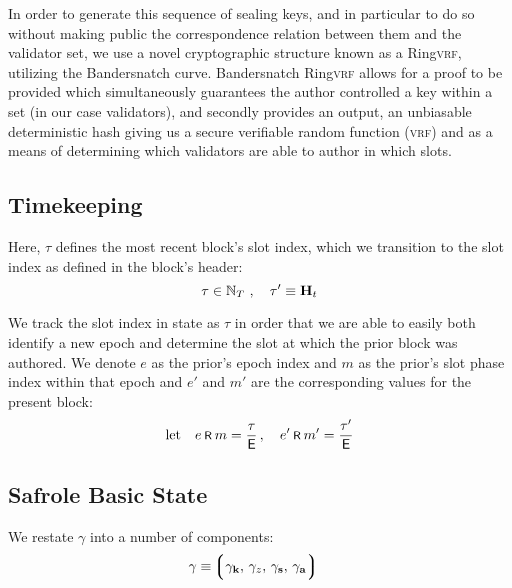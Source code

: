 In order to generate this sequence of sealing keys, and in particular to do so without making public the correspondence relation between them and the validator set, we use a novel cryptographic structure known as a Ring\textsc{vrf}, utilizing the Bandersnatch curve. Bandersnatch Ring\textsc{vrf} allows for a proof to be provided which simultaneously guarantees the author controlled a key within a set (in our case validators), and secondly provides an output, an unbiasable deterministic hash giving us a secure verifiable random function (\textsc{vrf}) and as a means of determining which validators are able to author in which slots.






\subsection{Timekeeping}\label{sec:timekeeping}

Here, $\tau$ defines the most recent block's slot index, which we transition to the slot index as defined in the block's header:
\begin{equation}\label{eq:timeslotindex}
  \tau \in \mathbb{N}_T \ ,\quad
  \tau' \equiv \mathbf{H}_t
\end{equation}

We track the slot index in state as $\tau$ in order that we are able to easily both identify a new epoch and determine the slot at which the prior block was authored. We denote $e$ as the prior's epoch index and $m$ as the prior's slot phase index within that epoch and $e'$ and $m'$ are the corresponding values for the present block:
\begin{align}
  \mathrm{let}\quad e \text{\hspace{2pt}\footnotesize{\textsf{R}}\hspace{2pt}} m = \frac{\tau}{\mathsf{{}E}} \,,\quad
  e' \text{\hspace{2pt}\footnotesize{\textsf{R}}\hspace{2pt}} m' = \frac{\tau'}{\mathsf{{}E}}
\end{align}









\subsection{Safrole Basic State}\label{sec:safrolebasicstate}

We restate $\gamma$ into a number of components:
\begin{align}\label{eq:consensusstatecomposition}
  \gamma &\equiv \tuple{\gamma_\mathbf{k}\ts\gamma_z\ts\gamma_\mathbf{s}\ts\gamma_\mathbf{a}}
\end{align}

